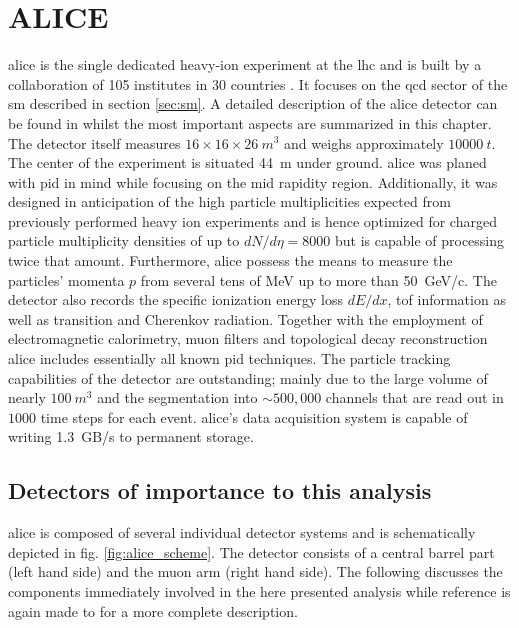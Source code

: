 \section{ALICE}
\gls{alice} is the single dedicated heavy-ion experiment at the \gls{lhc} and is built by a collaboration of 105 institutes in 30 countries \cite{Collaboration2008}. It focuses on the \gls{qcd} sector of the \gls{sm} described in section \ref{sec:sm}. A detailed description of the \gls{alice} detector can be found in \cite{Collaboration2008} whilst the most important aspects are summarized in this chapter. The detector itself measures $16\times 16\times \SI{26}{m^3}$ and weighs approximately $\SI{10000}{t}$. The center of the experiment is situated \SI{44}{m} under ground. \gls{alice} was planed with \gls{pid} in mind while focusing on the mid rapidity region. Additionally, it was designed in anticipation of the high particle multiplicities expected from previously performed heavy ion experiments and is hence optimized for charged particle multiplicity densities of up to $dN/d\eta = 8000$ but is capable of processing twice that amount.  Furthermore, \gls{alice} possess the means to measure the particles' momenta $p$ from several tens of \si{MeV} up to more than \SI{50}{GeV/c}. The detector also records the specific ionization energy loss $dE/dx$, \gls{tof} information as well as transition and Cherenkov radiation. Together with the employment of electromagnetic calorimetry, muon filters and topological decay reconstruction \gls{alice} includes essentially all known \gls{pid} techniques. The particle tracking capabilities of the detector are outstanding; mainly due to the large volume of nearly $\SI{100}{m^3}$ and the segmentation into $\sim 500,000$ channels that are read out in $1000$ time steps for each event. \gls{alice}'s data acquisition system is capable of writing \SI{1.3}{GB/s} to permanent storage.

\subsection{Detectors of importance to this analysis}
\label{sec:detectors}

\gls{alice} is composed of several individual detector systems and is schematically depicted in fig. \ref{fig:alice_scheme}. The detector consists of a central barrel part (left hand side) and the muon arm (right hand side). The following discusses the components immediately involved in the here presented analysis while reference is again made to \cite{Collaboration2008} for a more complete description. 



